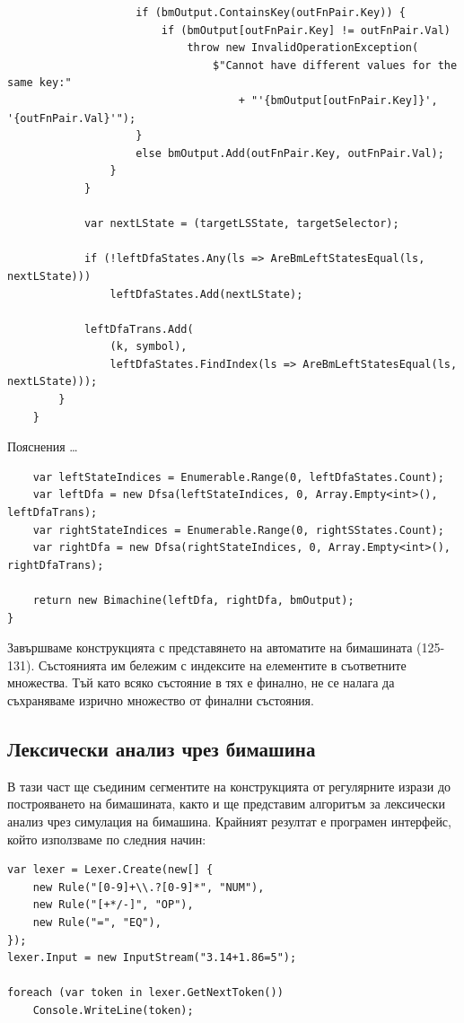 \documentclass[12pt, oneside]{article}
\theoremstyle{definition}
\begin{document}
\begin{verbatim}
                    if (bmOutput.ContainsKey(outFnPair.Key)) {
                        if (bmOutput[outFnPair.Key] != outFnPair.Val)
                            throw new InvalidOperationException(
								$"Cannot have different values for the same key:" 
									+ "'{bmOutput[outFnPair.Key]}', '{outFnPair.Val}'");
                    }
                    else bmOutput.Add(outFnPair.Key, outFnPair.Val);
                }
            }

            var nextLState = (targetLSState, targetSelector);

            if (!leftDfaStates.Any(ls => AreBmLeftStatesEqual(ls, nextLState)))
                leftDfaStates.Add(nextLState);

            leftDfaTrans.Add(
                (k, symbol),
                leftDfaStates.FindIndex(ls => AreBmLeftStatesEqual(ls, nextLState)));
        }
	}
\end{verbatim}

Пояснения \dots

\begin{verbatim}
    var leftStateIndices = Enumerable.Range(0, leftDfaStates.Count);
    var leftDfa = new Dfsa(leftStateIndices, 0, Array.Empty<int>(), leftDfaTrans);
    var rightStateIndices = Enumerable.Range(0, rightSStates.Count);
    var rightDfa = new Dfsa(rightStateIndices, 0, Array.Empty<int>(), rightDfaTrans);

    return new Bimachine(leftDfa, rightDfa, bmOutput);
}
\end{verbatim}

Завършваме конструкцията с представянето на автоматите на бимашината (125-131). Състоянията им бележим с индексите на елементите в съответните множества. Тъй като всяко състояние в тях е финално, не се налага да съхраняваме изрично множество от финални състояния.

\subsection{Лексически анализ чрез бимашина}

В тази част ще съединим сегментите на конструкцията от регулярните изрази до построяването на бимашината, както и ще представим алгоритъм за лексически анализ чрез симулация на бимашина. Крайният резултат е програмен интерфейс, който използваме по следния начин:

\begin{verbatim}
var lexer = Lexer.Create(new[] {
    new Rule("[0-9]+\\.?[0-9]*", "NUM"),
    new Rule("[+*/-]", "OP"),
    new Rule("=", "EQ"),
});
lexer.Input = new InputStream("3.14+1.86=5");

foreach (var token in lexer.GetNextToken())
    Console.WriteLine(token);
\end{verbatim}
\end{document}
